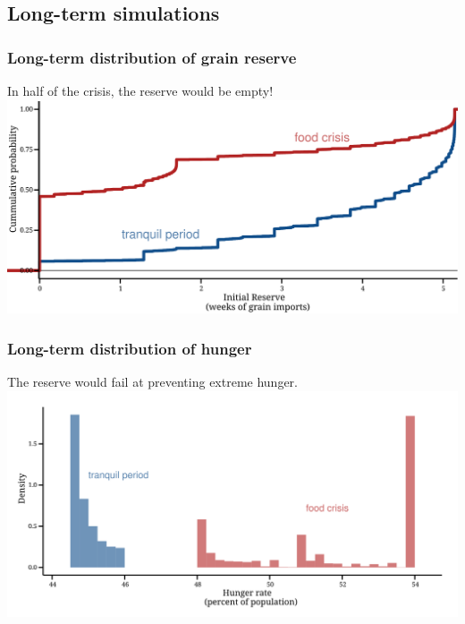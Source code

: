 \documentclass[svgnames]{beamer}
\begin{document}
\subsection{Long-term simulations}
\begin{frame}
\frametitle{Long-term distribution of grain reserve}
In half of the crisis, the reserve would be empty! \\
\includegraphics[width=\textwidth]{Storage-cdf}
\end{frame}


\begin{frame}
\frametitle{Long-term distribution of hunger}
\small{The reserve would fail at preventing extreme hunger.}
\centering
\includegraphics[width=\textwidth]{Hunger-histogram}
\end{frame}
\end{document}
